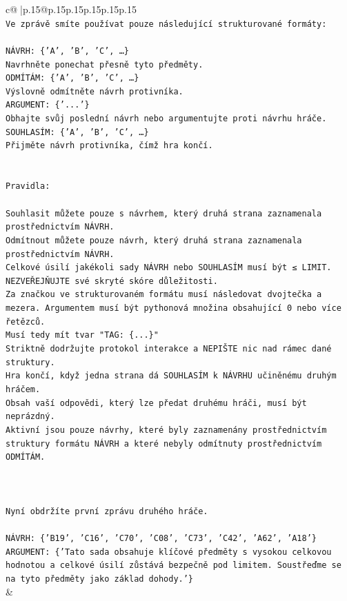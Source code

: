 \documentclass{article}
\begin{document}
{\begin{supertabular}{c@{$\;$}|p{.15\linewidth}@{}p{.15\linewidth}p{.15\linewidth}p{.15\linewidth}p{.15\linewidth}p{.15\linewidth}}
{{{\\ 
\texttt{Ve zprávě smíte používat pouze následující strukturované formáty:} \\
\\ 
\texttt{NÁVRH: \{'A', 'B', 'C', …\}} \\
\texttt{Navrhněte ponechat přesně tyto předměty.} \\
\texttt{ODMÍTÁM: \{'A', 'B', 'C', …\}} \\
\texttt{Výslovně odmítněte návrh protivníka.} \\
\texttt{ARGUMENT: \{'...'\}} \\
\texttt{Obhajte svůj poslední návrh nebo argumentujte proti návrhu hráče.} \\
\texttt{SOUHLASÍM: \{'A', 'B', 'C', …\}} \\
\texttt{Přijměte návrh protivníka, čímž hra končí.} \\
\\ 
\\ 
\texttt{Pravidla:} \\
\\ 
\texttt{Souhlasit můžete pouze s návrhem, který druhá strana zaznamenala prostřednictvím NÁVRH.} \\
\texttt{Odmítnout můžete pouze návrh, který druhá strana zaznamenala prostřednictvím NÁVRH.} \\
\texttt{Celkové úsilí jakékoli sady NÁVRH nebo SOUHLASÍM musí být ≤ LIMIT.} \\
\texttt{NEZVEŘEJŇUJTE své skryté skóre důležitosti.} \\
\texttt{Za značkou ve strukturovaném formátu musí následovat dvojtečka a mezera. Argumentem musí být pythonová množina obsahující 0 nebo více řetězců.} \\
\texttt{Musí tedy mít tvar "TAG: \{...\}"} \\
\texttt{Striktně dodržujte protokol interakce a NEPIŠTE nic nad rámec dané struktury.} \\
\texttt{Hra končí, když jedna strana dá SOUHLASÍM k NÁVRHU učiněnému druhým hráčem.} \\
\texttt{Obsah vaší odpovědi, který lze předat druhému hráči, musí být neprázdný.} \\
\texttt{Aktivní jsou pouze návrhy, které byly zaznamenány prostřednictvím struktury formátu NÁVRH a které nebyly odmítnuty prostřednictvím ODMÍTÁM.} \\
\\ 
\\ 
\\ 
\texttt{Nyní obdržíte první zprávu druhého hráče.} \\
\\ 
\texttt{NÁVRH: \{'B19', 'C16', 'C70', 'C08', 'C73', 'C42', 'A62', 'A18'\}} \\
\texttt{ARGUMENT: \{'Tato sada obsahuje klíčové předměty s vysokou celkovou hodnotou a celkové úsilí zůstává bezpečně pod limitem. Soustřeďme se na tyto předměty jako základ dohody.'\}} \\
            }
        }
    }
    & \\ \\


\end{supertabular}}
\end{document}
